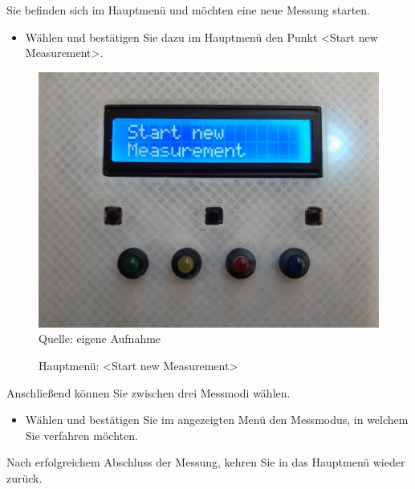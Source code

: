 \label{Durchführung}

Sie befinden sich im Hauptmenü und möchten eine neue Messung starten.
\begin{itemize}
	\item Wählen und bestätigen Sie dazu im Hauptmenü den Punkt <Start new Measurement>.	
\end{itemize}

\begin{figure}[!hbt]
	\centering
	\includegraphics[width=0.4\linewidth]{Images/StartNewMeasurement}
	\footnotesize \\Quelle: eigene Aufnahme
	\caption{Hauptmenü: <Start new Measurement>}
	\label{fig:startnew}
\end{figure}

Anschließend können Sie zwischen drei Messmodi wählen.
\begin{itemize}
	\item Wählen und bestätigen Sie im angezeigten Menü den Messmodus, in welchem Sie verfahren möchten.	
\end{itemize}
Nach erfolgreichem Abschluss der Messung, kehren Sie in das Hauptmenü wieder zurück.

